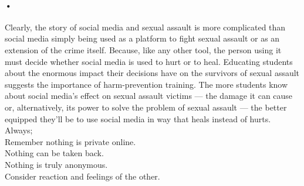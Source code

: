 \documentclass[12pt]{article}
\begin{document}
\paragraph{•}
Clearly, the story of social media and sexual assault is more complicated than social media simply being used as a platform to fight sexual assault or as an extension of the crime itself. Because, like any other tool, the person using it must decide whether social media is used to hurt or to heal. Educating students about the enormous impact their decisions have on the survivors of sexual assault suggests the importance of harm-prevention training. The more students know about social media’s effect on sexual assault victims — the damage it can cause or, alternatively, its power to solve the problem of sexual assault — the better equipped they’ll be to use social media in way that heals instead of hurts.\\
Always;\\
Remember nothing is private online.\\
Nothing can be taken back.\\
Nothing is truly anonymous.\\
Consider reaction and feelings of the other.
\end{document}
